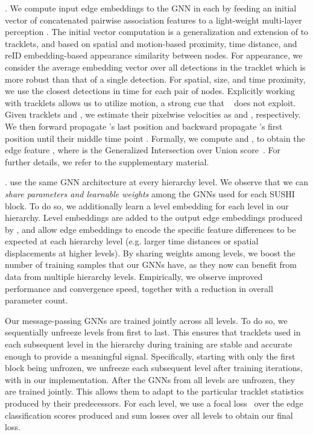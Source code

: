 \documentclass[10pt,twocolumn,letterpaper]{article}
\begin{document}
{{. We compute input edge embeddings to the GNN in each \blockname by feeding an initial vector of concatenated pairwise association features to a light-weight multi-layer perception . The initial vector computation is a generalization and extension of \cite{mpntrack} to tracklets, and based on spatial 
 and motion-based proximity, time distance, and reID embedding-based appearance similarity between nodes. For appearance, we consider the average embedding vector over all detections in the tracklet which is more robust than that of a single detection. For spatial, size, and time proximity, we use the closest detections in time for each pair of nodes. Explicitly working with tracklets allows us to utilize motion, a strong cue that ~\cite{mpntrack} does not exploit. Given tracklets  and , we estimate their pixelwise velocities as  and , respectively. We then forward propagate 's last position and backward propagate 's first position until their middle time point . Formally, we compute  and , to obtain the edge feature , where  is the Generalized Intersection over Union score~\cite{rezatofighi2019generalized}. For further details, we refer to the supplementary material.

. \blocknameplural use the same GNN architecture at every hierarchy level. We observe that we can \textit{share parameters and learnable weights} among the GNNs used for each SUSHI block. To do so, we additionally learn a level embedding  for each level  in our hierarchy. Level embeddings are added to the output edge embeddings produced by , and allow edge embeddings to encode the specific feature differences to be expected at each hierarchy level (e.g. larger time distances or  spatial displacements at higher levels). By sharing weights among levels, we boost the number of training samples that our GNNs have, as they now can benefit from data from multiple hierarchy levels. Empirically, we observe improved performance and convergence speed, together with a reduction in overall parameter count. 


 Our message-passing GNNs are trained jointly across all levels. To do so, we sequentially unfreeze levels from first to last. This ensures that tracklets used in each subsequent level in the hierarchy during training are stable and accurate enough to provide a meaningful signal. 
Specifically, starting with only the first block being unfrozen, we unfreeze each subsequent level after  training iterations, with  in our implementation. After the GNNs from all levels are unfrozen, they are trained jointly. This allows them to adapt to the particular tracklet statistics produced by their predecessors. 
For each level, we use a focal loss~\cite{focal_loss} over the edge classification scores produced and sum losses over all levels to obtain our final loss.








}}
\end{document}
